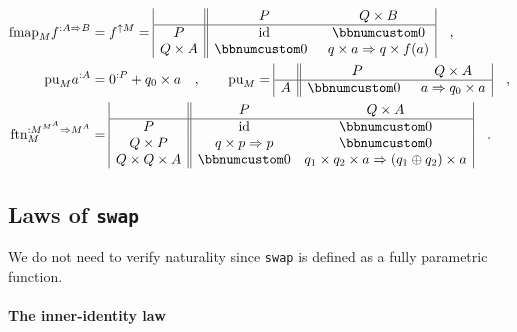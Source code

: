 \begin{align*}
\text{fmap}_{M}f^{:A\Rightarrow B} & =f^{\uparrow M}=\begin{array}{|c||cc|}
 & P & Q\times B\\
\hline P & \text{id} & \bbnum 0\\
Q\times A & \bbnum 0\enskip & q\times a\Rightarrow q\times f(a)
\end{array}\quad,\\
\text{pu}_{M}a^{:A} & =0^{:P}+q_{0}\times a\quad,\quad\quad\text{pu}_{M}=\begin{array}{|c||cc|}
 & P & Q\times A\\
\hline A & \bbnum 0\enskip & a\Rightarrow q_{0}\times a
\end{array}\quad,\\
\text{ftn}_{M}^{:M^{M^{A}}\Rightarrow M^{A}} & =\begin{array}{|c||cc|}
 & P & Q\times A\\
\hline P & \text{id} & \bbnum 0\\
Q\times P & q\times p\Rightarrow p & \bbnum 0\\
Q\times Q\times A & \bbnum 0 & q_{1}\times q_{2}\times a\Rightarrow\left(q_{1}\oplus q_{2}\right)\times a
\end{array}\quad.
\end{align*}


\subsection{Laws of \texttt{swap}}

We do not need to verify naturality since \lstinline!swap!
is defined as a fully parametric function.

\paragraph{The inner-identity law}

